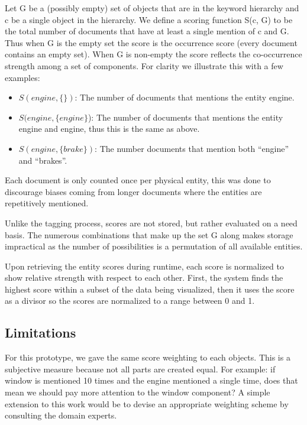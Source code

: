 Let G be a (possibly empty) set of objects that are in the keyword hierarchy and
c be a single object in the hierarchy. We define a scoring function S(c, G) to be 
the total number of documents that have at least a single mention of c and G. Thus 
when G is the empty set the score is the occurrence score (every document 
contains an empty set). When G is non-empty the score reflects the co-occurrence 
strength among a set of components. For clarity we illustrate this with a few examples:
\begin{itemize} [noitemsep]
  \item $S(engine, \{\})$: The number of documents that mentions the entity
  engine.
  
  \item $S(engine, \{engine\}$): The number of documents that mentions the
  entity engine and engine, thus this is the same as above. 
  
  \item $S(engine, \{brake\})$: The number documents that mention both
  ``engine'' and ``brakes''. 
\end{itemize}

Each document is only counted once per physical entity, this was done to
discourage biases coming from longer documents where the entities are
repetitively mentioned.

Unlike the tagging process, scores are not stored, but rather
evaluated on a need basis. The numerous combinations that make up the set G
along makes storage impractical as the number of possibilities is a permutation
of all available entities.
 
Upon retrieving the entity scores during runtime, each score is normalized
to show relative strength with respect to each other. First, the system finds
the highest score within a subset of the data being visualized, then it uses the
score as a divisor so the scores are normalized to a range between 0 and 1.

  
\subsection{Limitations} 
For this prototype, we gave the same score weighting to each objects. This is a 
subjective measure because not all parts are created equal. For example: if window 
is mentioned 10 times and the engine mentioned a single time, does that mean we 
should pay more attention to the window component? A simple extension to this
work would be to devise an appropriate weighting scheme by consulting the domain
experts. 

